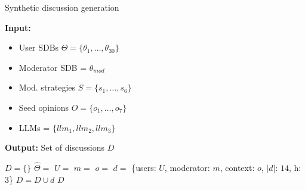 \begin{algorithm}
\caption{Synthetic discussion generation}
\label{alg:exp_generation}
\hspace*{\algorithmicindent} \textbf{Input:} 
         \begin{itemize}[noitemsep, nosep]
             \item User \acp{SDB} $\Theta = \{\theta_1, \dots, \theta_{30}\}$
             \item Moderator \ac{SDB} = $\theta_{mod}$
             \item Mod. strategies $S = \{s_1, \ldots, s_6\}$
             \item Seed opinions $O = \{o_1, \ldots, o_7\}$
             \item \acp{LLM} = $\{llm_1, llm_2, llm_3\}$
         \end{itemize}
         \hspace*{\algorithmicindent} \textbf{Output:} Set of discussions $D$
\begin{algorithmic}[1]
    \State $D = \{\}$
                \State $\hat{\Theta} = $ 
                \State $U =$  
                \State $m = $ 
                \State $o = $ 
                \State $d =$ \{users: $U$, moderator: $m$, context: $o$, $\vert d \rvert$: $14$, h: $3$\}
                \State $D = D \cup d$
            \EndFor
        \EndFor
    \EndFor
    \State \Return $D$
\end{algorithmic}
\end{algorithm}
